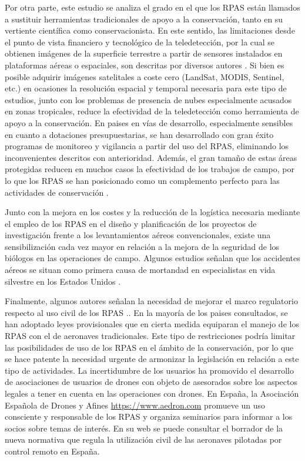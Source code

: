 \documentclass[11pt,]{article}
\begin{document}
Por otra parte, este estudio se analiza el grado en el que los RPAS
están llamados a sustituir herramientas tradicionales de apoyo a la
conservación, tanto en su vertiente científica como conservacionista. En
este sentido, las limitaciones desde el punto de vista financiero y
tecnológico de la teledetección, por la cual se obtienen imágenes de la
superficie terrestre a partir de sensores instalados en plataformas
aéreas o espaciales, son descritas por diversos autores \citep{Koh2012}.
Si bien es posible adquirir imágenes satelitales a coste cero (LandSat,
MODIS, Sentinel, etc.) en ocasiones la resolución espacial y temporal
necesaria para este tipo de estudios, junto con los problemas de
presencia de nubes especialmente acusados en zonas tropicales, reduce la
efectividad de la teledetección como herramienta de apoyo a la
conservación. En paises en vías de desarrollo, especialmente sensibles
en cuanto a dotaciones presupuestarias, se han desarrollado con gran
éxito programas de monitoreo y vigilancia a partir del uso del RPAS,
eliminando los inconvenientes descritos con anterioridad. Además, el
gran tamaño de estas áreas protegidas reducen en muchos casos la
efectividad de los trabajos de campo, por lo que los RPAS se han
posicionado como un complemento perfecto para las actividades de
conservación \citep{Zahawi2015}.

Junto con la mejora en los costes y la reducción de la logística
necesaria mediante el empleo de los RPAS en el diseño y planificación de
los proyectos de investigación frente a los levantamientos aéreos
convencionales, existe una sensibilización cada vez mayor en relación a
la mejora de la seguridad de los biólogos en las operaciones de campo.
Algunos estudios señalan que los accidentes aéreos se situan como
primera causa de mortandad en especialistas en vida silvestre en los
Estados Unidos \citep{Sasse2003}.

Finalmente, algunos autores señalan la necesidad de mejorar el marco
regulatorio respecto al uso civil de los RPAS \citep{Nugraha2016}.. En
la mayoría de los paises consultados, se han adoptado leyes
provisionales que en cierta medida equiparan el manejo de los RPAS con
el de aeronaves tradicionales. Este tipo de restricciones podría limitar
las posibilidades de uso de los RPAS en el ámbito de la conservación,
por lo que se hace patente la necesidad urgente de armonizar la
legislación en relación a este tipo de actividades. La incertidumbre de
los usuarios ha promovido el desarrollo de asociaciones de usuarios de
drones con objeto de asesorados sobre los aspectos legales a tener en
cuenta en las operaciones con drones. En España, la Asociación Española
de Drones y Afines \url{https://www.aedron.com} promueve un uso
consciente y responsable de los RPAS y organiza seminarios para informar
a los socios sobre temas de interés. En su web se puede consultar el
borrador de la nueva normativa que regula la utilización civil de las
aeronaves pilotadas por control remoto en España.
\end{document}
